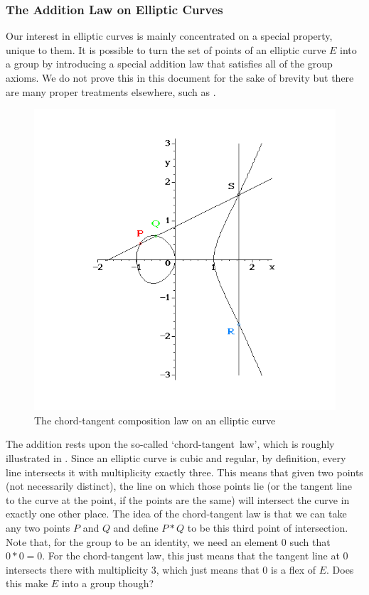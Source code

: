\subsubsection{The Addition Law on Elliptic Curves}
Our interest in elliptic curves is mainly concentrated on a special property, unique to them.
It is possible to turn the set of points of an elliptic curve $E$ into a group by introducing a special addition law that satisfies all of the group axioms.
We do not prove this in this document for the sake of brevity but there are many proper treatments elsewhere, such as \cite{silverman2009}.
\begin{figure}[htpb]
	\centering
	\includegraphics[scale=0.5]{addition.png}
	\caption{The chord-tangent composition law on an elliptic curve}
	\label{chord-tangent}
\end{figure}
The addition rests upon the so-called `chord-tangent~law', which is roughly illustrated in .
Since an elliptic curve is cubic and regular, by definition, every line intersects it with multiplicity exactly three.
This means that given two points (not necessarily distinct), the line on which those points lie (or the tangent line to the curve at the point, if the points are the same) will intersect the curve in exactly one other place.
The idea of the chord-tangent law is that we can take any two points $P$ and $Q$ and define $P * Q$ to be this third point of intersection.
Note that, for the group to be an identity, we need an element $0$ such that $0 * 0 = 0$.
For the chord-tangent law, this just means that the tangent line at $0$ intersects there with multiplicity 3, which just means that $0$ is a flex of $E$.
Does this make $E$ into a group though?

